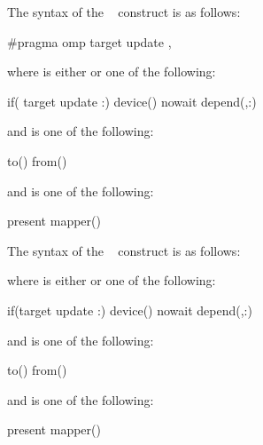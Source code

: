 \syntax
\begin{ccppspecific}
The syntax of the ~ construct is as follows:

\begin{ompcPragma}
#pragma omp target update \plc{clause[ [ [},\plc{] clause] ... ] new-line}
\end{ompcPragma}
where  is either  or one of the following:

\begin{indentedcodelist}
if(\plc{[} target update :\plc{] scalar-expression})
device()
nowait
depend(\plc{[depend-modifier},\plc{] dependence-type }:)
\end{indentedcodelist}

and  is one of the following:

\begin{indentedcodelist}
to()
from()
\end{indentedcodelist}

and  is one of the following:

\begin{indentedcodelist}
present
mapper()
\end{indentedcodelist}

\end{ccppspecific}

\begin{fortranspecific}
The syntax of the ~ construct is as follows:


where  is either  or one of the following:

\begin{indentedcodelist}
if(\plc{[}target update :\plc{] scalar-logical-expression})
device()
nowait
depend(\plc{[depend-modifier},\plc{] dependence-type }:)
\end{indentedcodelist}

and  is one of the following:

\begin{indentedcodelist}
to()
from()
\end{indentedcodelist}

and  is one of the following:

\begin{indentedcodelist}
present
mapper()
\end{indentedcodelist}

\end{fortranspecific}

